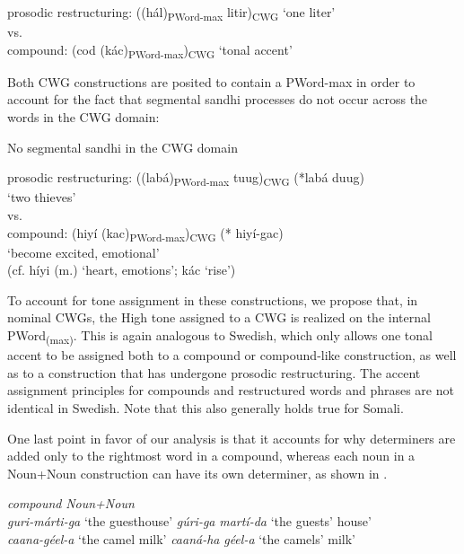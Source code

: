 \documentclass[output=paper]{langscibook}
\begin{document}
\ea \label{ex:downing:22}
 prosodic restructuring: ((hál)\textsubscript{PWord-max} litir)\textsubscript{CWG} ‘one liter’\\

{vs.}\\

{compound:   (cod (kác)\textsubscript{PWord-max})\textsubscript{CWG} ‘tonal accent’}\\
\z

Both CWG constructions are posited to contain a PWord-max in order to account for the fact that segmental sandhi processes do not occur across the words in the CWG domain:


\ea  No segmental sandhi in the CWG domain \label{ex:downing:23}

prosodic restructuring: ((labá)\textsubscript{PWord-max} tuug)\textsubscript{CWG}  (*labá duug)\\
  \textup{‘two thieves’}\\

{vs.}\\

compound:   (hiyí (kac)\textsubscript{PWord-max})\textsubscript{CWG}  (* hiyí-gac)\\

      ‘become excited, emotional’\\
\textup{(cf.} \textup{híyi} (m.) ‘heart, emotions’; \textup{kác} ‘rise’)\\
\z


To account for tone assignment in these constructions, we propose that, in nominal CWGs, the High tone assigned to a CWG is realized on the internal PWord\textsubscript{(max)}. This is again analogous to Swedish, which only allows one tonal accent to be assigned both to a compound or compound-like construction, as well as to a construction that has undergone prosodic restructuring. The accent assignment principles for compounds and restructured words and phrases are not identical in Swedish. Note that this also generally holds true for Somali.

One last point in favor of our analysis is that it accounts for why determiners are added only to the rightmost word in a compound, whereas each noun in a Noun+Noun construction can have its own determiner, as shown in .


\ea \label{ex:downing:24}
  \textit{compound}          \textit{Noun+Noun}\\
\ea  \textit{guri-márti-ga} ‘the guesthouse’   \textit{gúri-ga} \textit{martí-da} ‘the guests’ house’\\
\ex   \textit{caana-géel-a} ‘the camel milk’  \textit{caaná-ha} \textit{géel-a} ‘the camels’ milk’\\
\z
\z
\end{document}
